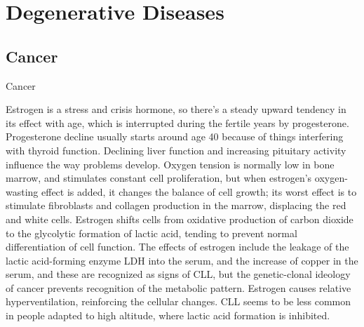 \documentclass[11pt,oneside,openany,extrafontsizes]{memoir}
\begin{document}
\section{Degenerative Diseases}
\subsection{Cancer}

\begin{standalonequote}{Cancer}

    \begin{answer}
        Estrogen is a stress and crisis hormone, so there's a steady upward tendency in its effect with age, which is interrupted during the fertile years by progesterone. Progesterone decline usually starts around age 40 because of things interfering with thyroid function. Declining liver function and increasing pituitary activity influence the way problems develop. Oxygen tension is normally low in bone marrow, and stimulates constant cell proliferation, but when estrogen's oxygen-wasting effect is added, it changes the balance of cell growth; its worst effect is to stimulate fibroblasts and collagen production in the marrow, displacing the red and white cells. Estrogen shifts cells from oxidative production of carbon dioxide to the glycolytic formation of lactic acid, tending to prevent normal differentiation of cell function. The effects of estrogen include the leakage of the lactic acid-forming enzyme LDH into the serum, and the increase of copper in the serum, and these are recognized as signs of CLL, but the genetic-clonal ideology of cancer prevents recognition of the metabolic pattern. Estrogen causes relative hyperventilation, reinforcing the cellular changes. CLL seems to be less common in people adapted to high altitude, where lactic acid formation is inhibited. 
    \end{answer}
\end{standalonequote}
\end{document}
